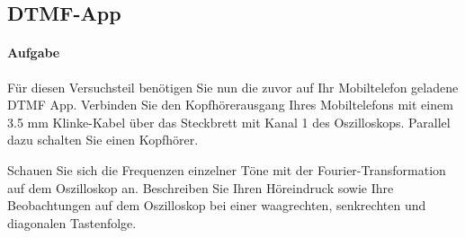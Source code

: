 \documentclass[10pt]{scrreprt}
\begin{document}
        \subsection{DTMF-App}
        \paragraph{Aufgabe}
        Für diesen Versuchsteil benötigen Sie nun die zuvor auf Ihr Mobiltelefon geladene \glqq{}DTMF\grqq{} App.
        Verbinden Sie den Kopfhörerausgang Ihres Mobiltelefons mit einem 3.5 mm Klinke-Kabel
        über das Steckbrett mit Kanal 1 des Oszilloskops. Parallel dazu schalten Sie einen Kopfhörer.

        Schauen Sie sich die Frequenzen einzelner Töne mit der Fourier-Transformation auf dem
        Oszilloskop an. Beschreiben Sie Ihren Höreindruck sowie Ihre Beobachtungen auf dem
        Oszilloskop bei einer waagrechten, senkrechten und diagonalen Tastenfolge.
\end{document}
